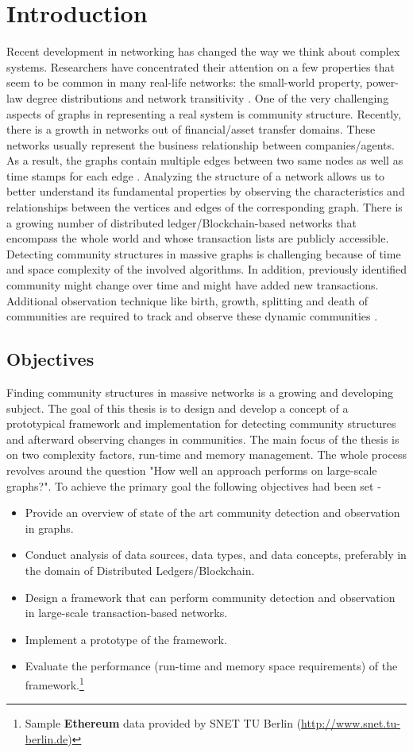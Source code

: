 \chapter{Introduction}\label{cha:1_introduction}
Recent development in networking has changed the way we think about complex systems. Researchers have concentrated their attention on a few properties that seem to be common in many real-life networks: the small-world property, power-law degree distributions and network transitivity \cite{ref-1}. One of the very challenging aspects of graphs in representing a real system is community structure. Recently, there is a growth in networks out of financial/asset transfer domains. These networks usually represent the business relationship between companies/agents. As a result, the graphs contain multiple edges between two same nodes as well as time stamps for each edge \cite{ref-19}. Analyzing the structure of a network allows us to better understand its fundamental properties by observing the characteristics and relationships between the vertices and edges of the corresponding graph. There is a growing number of distributed ledger/Blockchain-based networks that encompass the whole world and whose transaction lists are publicly accessible. Detecting community structures in massive graphs is challenging because of time and space complexity of the involved algorithms. In addition, previously identified community might change over time and might have added new transactions. Additional observation technique like birth, growth, splitting and death of communities are required to track and observe these dynamic communities \cite{ref-39}.

\section{Objectives}\label{objectives}
Finding community structures in massive networks is a growing and developing subject. The goal of this thesis is to design and develop a concept of a prototypical framework and implementation for detecting community structures and afterward observing changes in communities. The main focus of the thesis is on two complexity factors, run-time and memory management. The whole process revolves around the question "How well an approach performs on large-scale graphs?". To achieve the primary goal the following objectives had been set -
\begin{itemize}
	\item Provide an overview of state of the art community detection and observation in graphs.
	\item Conduct analysis of data sources, data types, and data concepts, preferably in the domain of Distributed Ledgers/Blockchain.
	\item Design a framework that can perform community detection and observation in large-scale transaction-based networks.
	\item Implement a prototype of the framework.
	\item Evaluate the performance (run-time and memory space requirements) of the framework.\footnote{Sample \textbf{Ethereum} data provided by SNET TU Berlin (\hyperlink{SNET-TUB}{http://www.snet.tu-berlin.de})}
\end{itemize}

